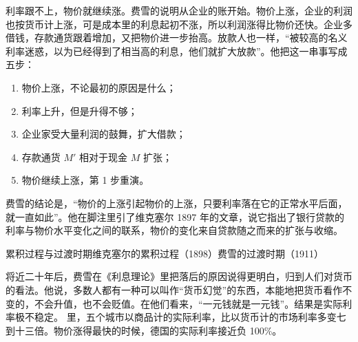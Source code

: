 利率跟不上，物价就继续涨。费雪的说明从企业的账开始。物价上涨，企业的利润也按货币计上涨，可是成本里的利息起初不涨，所以利润涨得比物价还快\cite{fisher1911}。企业多借钱，存款通货跟着增加，又把物价进一步抬高\cite{fisher1911}。放款人也一样，“被较高的名义利率迷惑，以为已经得到了相当高的利息，他们就扩大放款”\cite{fisher1911}。他把这一串事写成五步：
\begin{enumerate}
\item 物价上涨，不论最初的原因是什么；
\item 利率上升，但是升得不够；
\item 企业家受大量利润的鼓舞，扩大借款；
\item 存款通货 $M'$ 相对于现金 $M$ 扩张；
\item 物价继续上涨，第 1 步重演\cite{fisher1911}。
\end{enumerate}
费雪的结论是，“物价的上涨引起物价的上涨，只要利率落在它的正常水平后面，就一直如此”\cite{fisher1911}。他在脚注里引了维克塞尔 1897 年的文章，说它指出了银行贷款的利率与物价水平变化之间的联系，物价的变化来自贷款随之而来的扩张与收缩\cite{fisher1911}。

\begin{compare}{累积过程与过渡时期}{维克塞尔的累积过程（1898）}{费雪的过渡时期（1911）}
\end{compare}

将近二十年后，费雪在《利息理论》里把落后的原因说得更明白，归到人们对货币的看法。他说，多数人都有一种可以叫作“货币幻觉”的东西，本能地把货币看作不变的，不会升值，也不会贬值\cite{fisher1930}。在他们看来，“一元钱就是一元钱”\cite{fisher1930}。结果是实际利率极不稳定。 里，五个城市以商品计的实际利率，比以货币计的市场利率多变七到十三倍\cite{fisher1930}。物价涨得最快的时候，德国的实际利率接近负 100\%\cite{fisher1930}。

